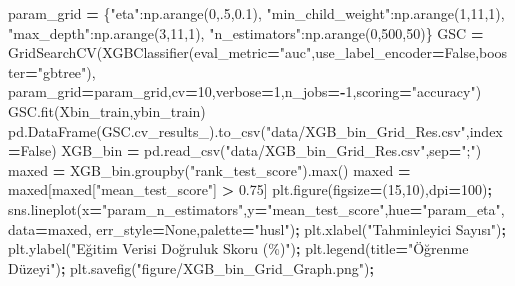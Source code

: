 \documentclass[12pt,twoside]{deuthesis}
\newenvironment{Shaded}{\begin{snugshade}}{\end{snugshade}}
\newcommand{\BuiltInTok}[1]{#1}
\newcommand{\DecValTok}[1]{\textcolor[rgb]{0.00,0.00,0.81}{#1}}
\newcommand{\FloatTok}[1]{\textcolor[rgb]{0.00,0.00,0.81}{#1}}
\newcommand{\NormalTok}[1]{#1}
\newcommand{\OperatorTok}[1]{\textcolor[rgb]{0.81,0.36,0.00}{\textbf{#1}}}
\newcommand{\StringTok}[1]{\textcolor[rgb]{0.31,0.60,0.02}{#1}}
\newcommand{\VariableTok}[1]{\textcolor[rgb]{0.00,0.00,0.00}{#1}}
\begin{document}
\scriptsize
\begin{Shaded}
\begin{Highlighting}[]
\NormalTok{param\_grid }\OperatorTok{=}\NormalTok{ \{}\StringTok{"eta"}\NormalTok{:np.arange(}\DecValTok{0}\NormalTok{,}\FloatTok{.5}\NormalTok{,}\FloatTok{0.1}\NormalTok{),}
              \StringTok{"min\_child\_weight"}\NormalTok{:np.arange(}\DecValTok{1}\NormalTok{,}\DecValTok{11}\NormalTok{,}\DecValTok{1}\NormalTok{),}
              \StringTok{"max\_depth"}\NormalTok{:np.arange(}\DecValTok{3}\NormalTok{,}\DecValTok{11}\NormalTok{,}\DecValTok{1}\NormalTok{),}
              \StringTok{"n\_estimators"}\NormalTok{:np.arange(}\DecValTok{0}\NormalTok{,}\DecValTok{500}\NormalTok{,}\DecValTok{50}\NormalTok{)\}}
\NormalTok{GSC }\OperatorTok{=}\NormalTok{ GridSearchCV(XGBClassifier(eval\_metric}\OperatorTok{=}\StringTok{"auc"}\NormalTok{,use\_label\_encoder}\OperatorTok{=}\VariableTok{False}\NormalTok{,booster}\OperatorTok{=}\StringTok{"gbtree"}\NormalTok{),}
\NormalTok{                                param\_grid}\OperatorTok{=}\NormalTok{param\_grid,cv}\OperatorTok{=}\DecValTok{10}\NormalTok{,verbose}\OperatorTok{=}\DecValTok{1}\NormalTok{,n\_jobs}\OperatorTok{={-}}\DecValTok{1}\NormalTok{,scoring}\OperatorTok{=}\StringTok{"accuracy"}\NormalTok{)}
\NormalTok{GSC.fit(Xbin\_train,ybin\_train)                                }
\NormalTok{pd.DataFrame(GSC.cv\_results\_).to\_csv(}\StringTok{"data/XGB\_bin\_Grid\_Res.csv"}\NormalTok{,index}\OperatorTok{=}\VariableTok{False}\NormalTok{)}
\NormalTok{XGB\_bin }\OperatorTok{=}\NormalTok{ pd.read\_csv(}\StringTok{"data/XGB\_bin\_Grid\_Res.csv"}\NormalTok{,sep}\OperatorTok{=}\StringTok{";"}\NormalTok{)}
\NormalTok{maxed }\OperatorTok{=}\NormalTok{ XGB\_bin.groupby(}\StringTok{"rank\_test\_score"}\NormalTok{).}\BuiltInTok{max}\NormalTok{()}
\NormalTok{maxed }\OperatorTok{=}\NormalTok{ maxed[maxed[}\StringTok{"mean\_test\_score"}\NormalTok{] }\OperatorTok{\textgreater{}} \FloatTok{0.75}\NormalTok{]}
\NormalTok{plt.figure(figsize}\OperatorTok{=}\NormalTok{(}\DecValTok{15}\NormalTok{,}\DecValTok{10}\NormalTok{),dpi}\OperatorTok{=}\DecValTok{100}\NormalTok{)}\OperatorTok{;}
\NormalTok{sns.lineplot(x}\OperatorTok{=}\StringTok{"param\_n\_estimators"}\NormalTok{,y}\OperatorTok{=}\StringTok{"mean\_test\_score"}\NormalTok{,hue}\OperatorTok{=}\StringTok{"param\_eta"}\NormalTok{,data}\OperatorTok{=}\NormalTok{maxed,}
\NormalTok{             err\_style}\OperatorTok{=}\VariableTok{None}\NormalTok{,palette}\OperatorTok{=}\StringTok{"husl"}\NormalTok{)}\OperatorTok{;}
\NormalTok{plt.xlabel(}\StringTok{"Tahminleyici Sayısı"}\NormalTok{)}\OperatorTok{;}
\NormalTok{plt.ylabel(}\StringTok{"Eğitim Verisi Doğruluk Skoru (\%)"}\NormalTok{)}\OperatorTok{;}
\NormalTok{plt.legend(title}\OperatorTok{=}\StringTok{"Öğrenme Düzeyi"}\NormalTok{)}\OperatorTok{;}
\NormalTok{plt.savefig(}\StringTok{"figure/XGB\_bin\_Grid\_Graph.png"}\NormalTok{)}\OperatorTok{;}
\end{Highlighting}
\end{Shaded}
\end{document}

